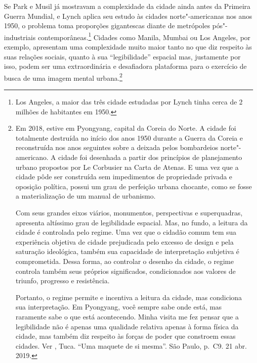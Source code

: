 Se Park e Musil já mostravam a complexidade da cidade ainda antes da
Primeira Guerra Mundial, e Lynch aplica seu estudo às cidades
norte"-americanas nos anos 1950, o problema toma proporções gigantescas
diante de metrópoles pós"-industriais contemporâneas.\footnote{Los
  Angeles, a maior das três cidade estudadas por Lynch tinha cerca de 2
  milhões de habitantes em 1950.} Cidades como Manila, Mumbai ou Los
Angeles, por exemplo, apresentam uma complexidade muito maior tanto no
que diz respeito às suas relações sociais, quanto à sua ``legibilidade''
espacial mas, justamente por isso, podem ser uma extraordinária e
desafiadora plataforma para o exercício de busca de uma imagem mental
urbana.\footnote{Em 2018, estive em Pyongyang, capital da Coreia do
  Norte. A cidade foi totalmente destruída no início dos anos 1950
  durante a Guerra da Coreia e reconstruída nos anos seguintes sobre a
  {} deixada pelos bombardeios norte"-americano. A cidade
  foi desenhada a partir dos princípios de planejamento urbano propostos
  por Le Corbusier na Carta de Atenas. E uma vez que a cidade pôde ser
  construída sem impedimentos de propriedade privada e oposição
  política, possui um grau de perfeição urbana chocante, como se fosse a
  materialização de um manual de urbanismo.

  Com seus grandes eixos viários, monumentos, perspectivas e
  superquadras, apresenta altíssimo grau de legibilidade espacial. Mas,
  no fundo, a leitura da cidade é controlada pelo regime. Uma vez que o
  cidadão comum tem sua experiência objetiva de cidade prejudicada pelo
  excesso de design e pela saturação ideológica, também sua capacidade
  de interpretação subjetiva é comprometida. Dessa forma, ao controlar o
  desenho da cidade, o regime controla também seus próprios
  significados, condicionados aos valores de triunfo, progresso e
  resistência.

  Portanto, o regime permite e incentiva a leitura da cidade, mas
  condiciona sua interpretação. Em Pyongyang, você sempre sabe onde
  está, mas raramente sabe o que está acontecendo. Minha visita me fez
  pensar que a legibilidade não é apenas uma qualidade relativa apenas à
  forma física da cidade, mas também diz respeito às forças de poder que
  constroem essas cidades. Ver , Tuca. ``Uma maquete de si
  mesma''. {} São Paulo, p.~C9. 21 abr. 2019.}

